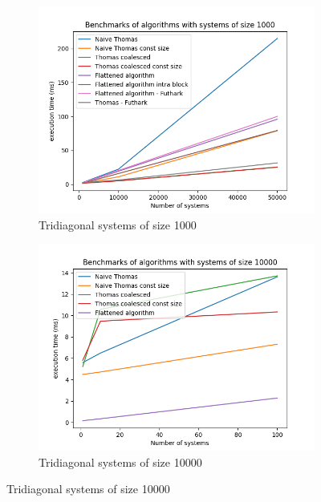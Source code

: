\documentclass[a4paper,oneside]{memoir}
\begin{document}
\begin{figure}[H]
    \begin{subfigure}[b]{0.6\textwidth}
        \centering
    \includegraphics[width=\textwidth]{timings_1000.png}
    \caption{Tridiagonal systems of size 1000}
    \label{fig:bench1000}
    \end{subfigure}
    \begin{subfigure}[b]{0.6\textwidth}
        \centering
    \includegraphics[width=\textwidth]{timings_10000.png}
    \caption{Tridiagonal systems of size 10000}
    \label{fig:bench10000}
    \end{subfigure}
    
 \end{figure}
\end{document}
